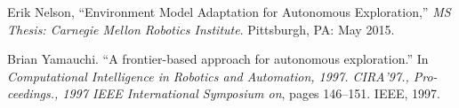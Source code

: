 \documentclass[12pt]{article}
\begin{document}
\begin{thebibliography}{99}

 Erik Nelson, ``Environment Model Adaptation for Autonomous Exploration,'' \textit{MS Thesis: Carnegie Mellon Robotics Institute}. Pittsburgh, PA: May 2015.

 Brian Yamauchi. ``A frontier-based approach for autonomous exploration.'' In \textit{Computational Intelligence in Robotics and Automation, 1997. CIRA’97., Pro- ceedings., 1997 IEEE International Symposium on}, pages 146–151. IEEE, 1997.
  
\end{thebibliography}
\end{document}
